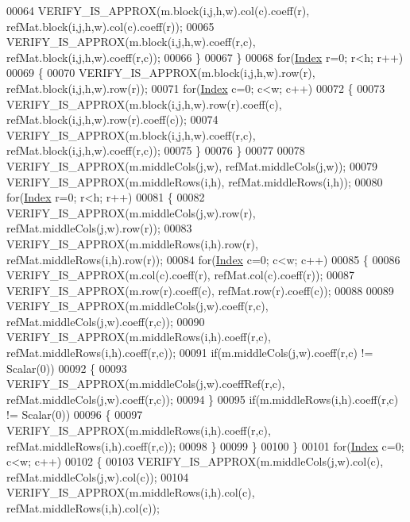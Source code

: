 \begin{DoxyCode}
00064           VERIFY\_IS\_APPROX(m.block(i,j,h,w).col(c).coeff(r), refMat.block(i,j,h,w).col(c).coeff(r));
00065           VERIFY\_IS\_APPROX(m.block(i,j,h,w).coeff(r,c), refMat.block(i,j,h,w).coeff(r,c));
00066         \}
00067       \}
00068       \textcolor{keywordflow}{for}(\hyperlink{namespace_eigen_a62e77e0933482dafde8fe197d9a2cfde}{Index} r=0; r<h; r++)
00069       \{
00070         VERIFY\_IS\_APPROX(m.block(i,j,h,w).row(r), refMat.block(i,j,h,w).row(r));
00071         \textcolor{keywordflow}{for}(\hyperlink{namespace_eigen_a62e77e0933482dafde8fe197d9a2cfde}{Index} c=0; c<w; c++)
00072         \{
00073           VERIFY\_IS\_APPROX(m.block(i,j,h,w).row(r).coeff(c), refMat.block(i,j,h,w).row(r).coeff(c));
00074           VERIFY\_IS\_APPROX(m.block(i,j,h,w).coeff(r,c), refMat.block(i,j,h,w).coeff(r,c));
00075         \}
00076       \}
00077       
00078       VERIFY\_IS\_APPROX(m.middleCols(j,w), refMat.middleCols(j,w));
00079       VERIFY\_IS\_APPROX(m.middleRows(i,h), refMat.middleRows(i,h));
00080       \textcolor{keywordflow}{for}(\hyperlink{namespace_eigen_a62e77e0933482dafde8fe197d9a2cfde}{Index} r=0; r<h; r++)
00081       \{
00082         VERIFY\_IS\_APPROX(m.middleCols(j,w).row(r), refMat.middleCols(j,w).row(r));
00083         VERIFY\_IS\_APPROX(m.middleRows(i,h).row(r), refMat.middleRows(i,h).row(r));
00084         \textcolor{keywordflow}{for}(\hyperlink{namespace_eigen_a62e77e0933482dafde8fe197d9a2cfde}{Index} c=0; c<w; c++)
00085         \{
00086           VERIFY\_IS\_APPROX(m.col(c).coeff(r), refMat.col(c).coeff(r));
00087           VERIFY\_IS\_APPROX(m.row(r).coeff(c), refMat.row(r).coeff(c));
00088           
00089           VERIFY\_IS\_APPROX(m.middleCols(j,w).coeff(r,c), refMat.middleCols(j,w).coeff(r,c));
00090           VERIFY\_IS\_APPROX(m.middleRows(i,h).coeff(r,c), refMat.middleRows(i,h).coeff(r,c));
00091           \textcolor{keywordflow}{if}(m.middleCols(j,w).coeff(r,c) != Scalar(0))
00092           \{
00093             VERIFY\_IS\_APPROX(m.middleCols(j,w).coeffRef(r,c), refMat.middleCols(j,w).coeff(r,c));
00094           \}
00095           \textcolor{keywordflow}{if}(m.middleRows(i,h).coeff(r,c) != Scalar(0))
00096           \{
00097             VERIFY\_IS\_APPROX(m.middleRows(i,h).coeff(r,c), refMat.middleRows(i,h).coeff(r,c));
00098           \}
00099         \}
00100       \}
00101       \textcolor{keywordflow}{for}(\hyperlink{namespace_eigen_a62e77e0933482dafde8fe197d9a2cfde}{Index} c=0; c<w; c++)
00102       \{
00103         VERIFY\_IS\_APPROX(m.middleCols(j,w).col(c), refMat.middleCols(j,w).col(c));
00104         VERIFY\_IS\_APPROX(m.middleRows(i,h).col(c), refMat.middleRows(i,h).col(c));

\end{DoxyCode}
